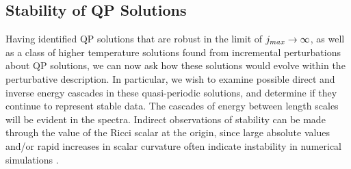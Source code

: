 \documentclass[../PhD.tex]{subfiles}
\begin{document}



\subsection{Stability of QP Solutions}

Having identified QP solutions that are robust in the limit of $j_{max} \to \infty$, as well as a class of higher temperature solutions found from incremental perturbations about QP solutions, we can now ask how these solutions would evolve within the perturbative description. In particular, we wish to examine possible direct and inverse energy cascades in these quasi-periodic solutions, and determine if they continue to represent stable data. The cascades of energy between length scales will be evident in the spectra. Indirect observations of stability can be made through the value of the Ricci scalar at the origin, since large absolute values and/or rapid increases in scalar curvature often indicate instability in numerical simulations \cite{1104.3702}. 
\end{document}
